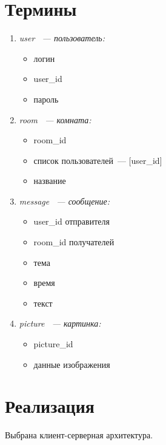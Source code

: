 \documentclass[a4paper,12pt]{extarticle}
\begin{document}
	\section{Термины}
	\begin{enumerate}
		\item \em user \em~--- пользователь:
			\begin{itemize}
				\item логин
				\item user\_id
				\item пароль
			\end{itemize}
			
		\item \em room \em~--- комната:
		\begin{itemize}
			\item room\_id
			\item список пользователей~--- [user\_id]
			\item название
		\end{itemize}
		
		\item \em message \em~--- сообщение:
		\begin{itemize}
			\item user\_id отправителя
			\item room\_id получателей
			\item тема
			\item время
			\item текст
		\end{itemize}
		
		\item \em picture \em~--- картинка:
		\begin{itemize}
			\item picture\_id
			\item данные изображения
		\end{itemize}
	\end{enumerate}
	
	\section{Реализация}
	Выбрана клиент-серверная архитектура.
	
\end{document}
